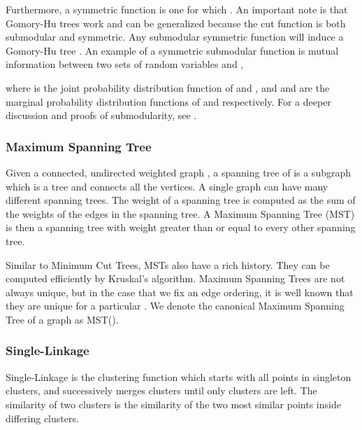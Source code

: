 \documentclass[twoside,11pt]{article}
\begin{document}
Furthermore, a symmetric function is one for which . An important note is that Gomory-Hu trees work and can be generalized because the cut function is both submodular and symmetric. Any submodular symmetric function will induce a Gomory-Hu tree \citep{schrijver2003combinatorial}. An example of a symmetric submodular function is mutual information between two sets of random variables  and ,

 where  is the joint probability distribution function of  and , and  and  are the marginal probability distribution functions of  and  respectively. For a deeper discussion and proofs of submodularity, see \cite{toshev2010submodular}.

\subsubsection{Maximum Spanning Tree}

Given a connected, undirected weighted graph , a spanning tree of  is a subgraph which is a tree and connects all the vertices. A single graph can have many different spanning trees. The weight of a spanning tree is computed as the sum of the weights of the edges in the spanning tree. A Maximum Spanning Tree (MST) is then a spanning tree with weight greater than or equal to every other spanning tree.

Similar to Minimum Cut Trees, MSTs also have a rich history. They can be computed efficiently by Kruskal's algorithm. Maximum Spanning Trees are not always unique, but in the case that we fix an edge ordering, it is well known that they are unique for a particular . We denote the canonical Maximum Spanning Tree of a graph as MST().


\subsubsection{Single-Linkage}

Single-Linkage is the clustering function which starts with all points in singleton clusters, and successively merges clusters until only
 clusters are left. The similarity of two clusters is the similarity of the two most similar points inside differing clusters. 
\begin{comment}
Single-Linkage is made formal
in algorithm \ref{alg:SL}.

\algsetup{indent=2em}
\newcommand{\SingleLinkage}{\ensuremath{\mbox{\sc Single-Linkage}}}
\begin{algorithm}[h!]
\caption{}\label{alg:SL}
\begin{algorithmic} [4]
\STATE Input: .
\STATE Output: The Single-Linkage -partitioning.
\medskip
\STATE 
\STATE 
\WHILE{}
	\STATE let ,  be the two ends of 
	\STATE let ,  be the clusters of  and 
	\IF{} \label{special}
		\STATE Merge  and 
		\STATE 
	\ENDIF
	\STATE 
\ENDWHILE
\STATE Output 
\end{algorithmic}
\end{algorithm}
\end{comment}
\end{document}
